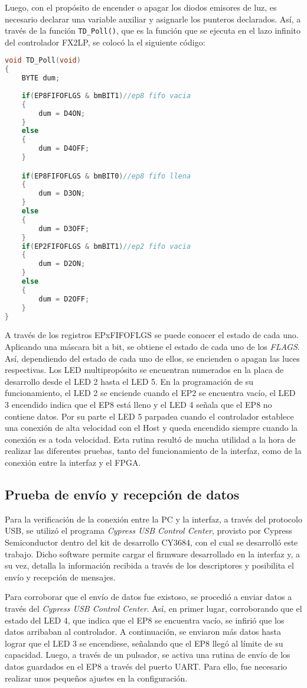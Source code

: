 Luego, con el propósito de encender o apagar los diodos emisores de luz, es necesario declarar una variable auxiliar y asignarle los punteros declarados. Así, a través de la función \verb|TD_Poll()|, que es la función que se ejecuta en el lazo infinito del controlador FX2LP, se colocó la el siguiente código:

	\begin{lstlisting}[language=C,backgroundcolor=\color{gray!30}]
void TD_Poll(void)  
{
	BYTE dum;
	
	if(EP8FIFOFLGS & bmBIT1)//ep8 fifo vacia
	{
		dum = D4ON;
	}
	else
	{
		dum = D4OFF;
	}

	if(EP8FIFOFLGS & bmBIT0)//ep8 fifo llena
	{
		dum = D3ON;
	}
	else
	{
		dum = D3OFF;
	}
	if(EP2FIFOFLGS & bmBIT1)//ep2 fifo vacia
	{
		dum = D2ON;
	}
	else
	{
		dum = D2OFF;
	}
}
	\end{lstlisting}

A través de los registros EPxFIFOFLGS se puede conocer el estado de cada uno. Aplicando una máscara bit a bit, se obtiene el estado de cada uno de los \textit{FLAGS}. Así, dependiendo del estado de cada uno de ellos, se encienden o apagan las luces respectivas.
Los LED multipropósito se encuentran numerados en la placa de desarrollo desde el LED 2 hasta el LED 5. En la programación de su funcionamiento, el LED 2 se enciende cuando el EP2 se encuentra vacío, el LED 3 encendido indica que el EP8 está lleno y el LED 4 señala que el EP8 no contiene datos. Por su parte el LED 5 parpadea cuando el controlador establece una conexión de alta velocidad con el Host y queda encendido siempre cuando la conexión es a toda velocidad. 
Esta rutina resultó de mucha utilidad a la hora de realizar las diferentes pruebas, tanto del funcionamiento de la interfaz, como de la conexión entre la interfaz y el FPGA.

\subsection{Prueba de envío y recepción de datos}
	Para la verificación de la conexión entre la PC y la interfaz, a través del protocolo USB, se utilizó el programa {\it Cypress USB Control Center}, provisto por Cypress Semiconductor dentro del kit de desarrollo CY3684, con el cual se desarrolló este trabajo. Dicho software permite cargar el firmware desarrollado en la interfaz y, a su vez, detalla la información recibida a través de los descriptores y posibilita el envío y recepción de mensajes.
	
	Para corroborar que el envío de datos fue existoso, se procedió a enviar datos a través del {\it Cypress USB Control Center}. Así, en primer lugar, corroborando que el estado del LED 4, que indica que el EP8 se encuentra vacío, se infirió que los datos arribaban al controlador. A continuación, se enviaron más datos hasta lograr que el LED 3 se encendiese, señalando que el EP8 llegó al límite de su capacidad. Luego, a través de un pulsador, se activa una rutina de envío de los datos guardados en el EP8 a través del puerto UART. Para ello, fue necesario realizar unos pequeños ajustes en la configuración.
	
